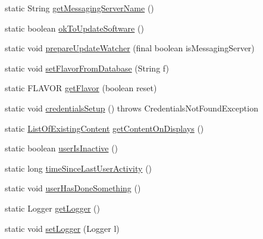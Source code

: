 \begin{DoxyCompactItemize}
static String \hyperlink{classgov_1_1fnal_1_1ppd_1_1dd_1_1GlobalVariables_a031a776923237b72e7cfa1e2804097ad}{get\-Messaging\-Server\-Name} ()
\item 
static boolean \hyperlink{classgov_1_1fnal_1_1ppd_1_1dd_1_1GlobalVariables_a3d2db19203c4e972d23055ac6ca6d728}{ok\-To\-Update\-Software} ()
\item 
static void \hyperlink{classgov_1_1fnal_1_1ppd_1_1dd_1_1GlobalVariables_a7a261637e9a06bba925ba4901ecf4479}{prepare\-Update\-Watcher} (final boolean is\-Messaging\-Server)
\item 
static void \hyperlink{classgov_1_1fnal_1_1ppd_1_1dd_1_1GlobalVariables_a199ba3417f9d46d69c2083e3c782d85e}{set\-Flavor\-From\-Database} (String f)
\item 
static F\-L\-A\-V\-O\-R \hyperlink{classgov_1_1fnal_1_1ppd_1_1dd_1_1GlobalVariables_a43d1f44dce5ac77b0d03e3c58a8f9533}{get\-Flavor} (boolean reset)
\item 
static void \hyperlink{classgov_1_1fnal_1_1ppd_1_1dd_1_1GlobalVariables_a3beb933e8664bc5cf625f37d4e0ad429}{credentials\-Setup} ()  throws Credentials\-Not\-Found\-Exception 
\item 
static \hyperlink{classgov_1_1fnal_1_1ppd_1_1dd_1_1changer_1_1ListOfExistingContent}{List\-Of\-Existing\-Content} \hyperlink{classgov_1_1fnal_1_1ppd_1_1dd_1_1GlobalVariables_a5dee2a221fa2d94a5baa8558800845e3}{get\-Content\-On\-Displays} ()
\item 
static boolean \hyperlink{classgov_1_1fnal_1_1ppd_1_1dd_1_1GlobalVariables_aba515ddabffe804f9830689e02ef0cda}{user\-Is\-Inactive} ()
\item 
static long \hyperlink{classgov_1_1fnal_1_1ppd_1_1dd_1_1GlobalVariables_a7480064c523e0ebb558122616d32544f}{time\-Since\-Last\-User\-Activity} ()
\item 
static void \hyperlink{classgov_1_1fnal_1_1ppd_1_1dd_1_1GlobalVariables_a526d778baf99fcb1eb1648e91c5e346d}{user\-Has\-Done\-Something} ()
\item 
static Logger \hyperlink{classgov_1_1fnal_1_1ppd_1_1dd_1_1GlobalVariables_a5f0114f559702931f77f0e571be95752}{get\-Logger} ()
\item 
static void \hyperlink{classgov_1_1fnal_1_1ppd_1_1dd_1_1GlobalVariables_a14e776ad97d0c10931fd61205c9d2b6f}{set\-Logger} (Logger l)
\end{DoxyCompactItemize}
